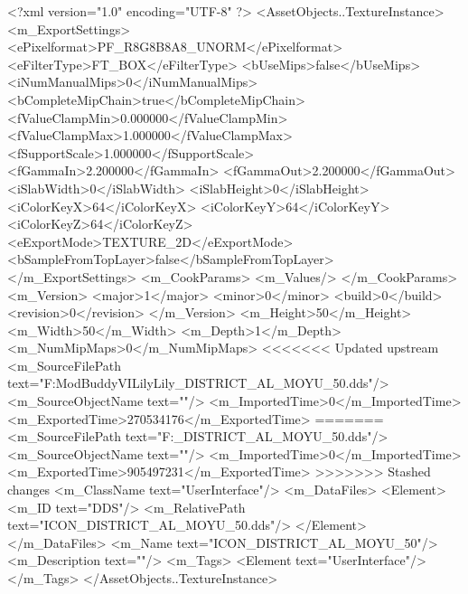 <?xml version="1.0" encoding="UTF-8" ?>
<AssetObjects..TextureInstance>
	<m_ExportSettings>
		<ePixelformat>PF_R8G8B8A8_UNORM</ePixelformat>
		<eFilterType>FT_BOX</eFilterType>
		<bUseMips>false</bUseMips>
		<iNumManualMips>0</iNumManualMips>
		<bCompleteMipChain>true</bCompleteMipChain>
		<fValueClampMin>0.000000</fValueClampMin>
		<fValueClampMax>1.000000</fValueClampMax>
		<fSupportScale>1.000000</fSupportScale>
		<fGammaIn>2.200000</fGammaIn>
		<fGammaOut>2.200000</fGammaOut>
		<iSlabWidth>0</iSlabWidth>
		<iSlabHeight>0</iSlabHeight>
		<iColorKeyX>64</iColorKeyX>
		<iColorKeyY>64</iColorKeyY>
		<iColorKeyZ>64</iColorKeyZ>
		<eExportMode>TEXTURE_2D</eExportMode>
		<bSampleFromTopLayer>false</bSampleFromTopLayer>
	</m_ExportSettings>
	<m_CookParams>
		<m_Values/>
	</m_CookParams>
	<m_Version>
		<major>1</major>
		<minor>0</minor>
		<build>0</build>
		<revision>0</revision>
	</m_Version>
	<m_Height>50</m_Height>
	<m_Width>50</m_Width>
	<m_Depth>1</m_Depth>
	<m_NumMipMaps>0</m_NumMipMaps>
<<<<<<< Updated upstream
	<m_SourceFilePath text="F:\1\Firaxis ModBuddy\Civilization VI\Assault Lily\Assault Lily\Textures\ICON_DISTRICT_AL_MOYU_50.dds"/>
	<m_SourceObjectName text=""/>
	<m_ImportedTime>0</m_ImportedTime>
	<m_ExportedTime>270534176</m_ExportedTime>
=======
	<m_SourceFilePath text="F:\DT\lilyimages\all\ICON_DISTRICT_AL_MOYU_50.dds"/>
	<m_SourceObjectName text=""/>
	<m_ImportedTime>0</m_ImportedTime>
	<m_ExportedTime>905497231</m_ExportedTime>
>>>>>>> Stashed changes
	<m_ClassName text="UserInterface"/>
	<m_DataFiles>
		<Element>
			<m_ID text="DDS"/>
			<m_RelativePath text="ICON_DISTRICT_AL_MOYU_50.dds"/>
		</Element>
	</m_DataFiles>
	<m_Name text="ICON_DISTRICT_AL_MOYU_50"/>
	<m_Description text=""/>
	<m_Tags>
		<Element text="UserInterface"/>
	</m_Tags>
</AssetObjects..TextureInstance>


